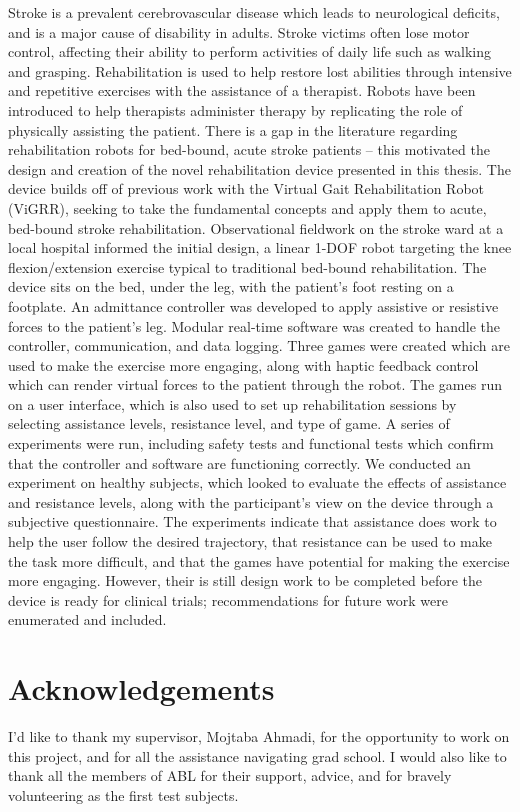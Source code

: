 \documentclass[12pt]{report}
\begin{document}
Stroke is a prevalent cerebrovascular disease which leads to neurological deficits, and is a major cause of disability in adults. Stroke victims often lose motor control, affecting their ability to perform activities of daily life such as walking and grasping. Rehabilitation is used to help restore lost abilities through intensive and repetitive exercises with the assistance of a therapist. Robots have been introduced to help therapists administer therapy by replicating the role of physically assisting the patient. There is a gap in the literature regarding rehabilitation robots for bed-bound, acute stroke patients -- this motivated the design and creation of the novel rehabilitation device presented in this thesis. The device builds off of previous work with the Virtual Gait Rehabilitation Robot (ViGRR), seeking to take the fundamental concepts and apply them to acute, bed-bound stroke rehabilitation. Observational fieldwork on the stroke ward at a local hospital informed the initial design, a linear 1-DOF robot targeting the knee flexion/extension exercise typical to traditional bed-bound rehabilitation. The device sits on the bed, under the leg, with the patient's foot resting on a footplate. An admittance controller was developed to apply assistive or resistive forces to the patient's leg. Modular real-time software was created to handle the controller, communication, and data logging. Three games were created which are used to make the exercise more engaging, along with haptic feedback control which can render virtual forces to the patient through the robot. The games run on a user interface, which is also used to set up rehabilitation sessions by selecting assistance levels, resistance level, and type of game. 
	A series of experiments were run, including safety tests and functional tests which confirm that the controller and software are functioning correctly. We conducted an experiment on healthy subjects, which looked to evaluate the effects of assistance and resistance levels, along with the participant's view on the device through a subjective questionnaire. The experiments indicate that assistance does work to help the user follow the desired trajectory, that resistance can be used to make the task more difficult, and that the games have potential for making the exercise more engaging. However, their is still design work to be completed before the device is ready for clinical trials; recommendations for future work were enumerated and included. 
	


\chapter*{Acknowledgements}
I'd like to thank my supervisor, Mojtaba Ahmadi, for the opportunity to work on this project, and for all the assistance navigating grad school. I would also like to thank all the members of ABL for their support, advice, and for bravely volunteering as the first test subjects. 
\end{document}
